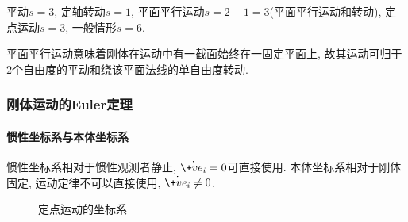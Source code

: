 \documentclass[../LectureNotes.tex]{subfiles}
\begin{document}
平动$s=3$, 定轴转动$s=1$, 平面平行运动$s=2+1 = 3$(平面平行运动和转动), 定点运动$s=3$, 一般情形$s=6$.


\begin{remark}
    平面平行运动意味着刚体在运动中有一截面始终在一固定平面上, 故其运动可归于$2$个自由度的平动和绕该平面法线的单自由度转动.
\end{remark}


\subsubsection{刚体运动的Euler定理} %
\label{ssub:刚体运动的euler定理}

\paragraph{惯性坐标系与本体坐标系} %
\label{par:惯性坐标系与本体坐标系}

惯性坐标系相对于惯性观测者静止, $\dot{\+ve_i} = 0$可直接使用. 本体坐标系相对于刚体固定, 运动定律不可以直接使用, $\dot{\+ve_i}\neq 0$.


\begin{figure}[ht]
    \centering
    \caption{定点运动的坐标系}
\end{figure}
\end{document}
